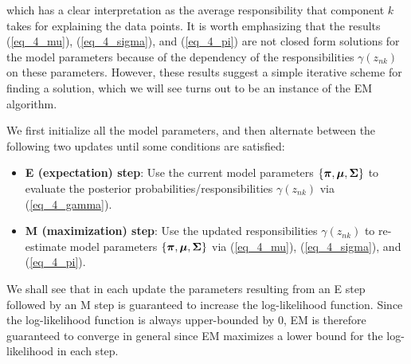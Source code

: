 \documentclass[../book-template.tex]{subfiles}
\begin{document}
which has a clear interpretation as the average responsibility that component $k$ takes for explaining the data points. It is worth emphasizing that the results (\ref{eq_4_mu}), (\ref{eq_4_sigma}), and (\ref{eq_4_pi}) are not closed form solutions for the model parameters because of the dependency of the responsibilities $\gamma(z_{nk})$ on these parameters. However, these results suggest a simple iterative scheme for finding a solution, which we will see turns out to be an instance of the EM algorithm. 
\par We first initialize all the model parameters, and then alternate between the following two updates until some conditions are satisfied:
\begin{itemize}
	\item  \textbf{E (expectation) step}: Use the current model parameters $\{\bm{\pi}, \bm{\mu}, {\bf \Sigma}\}$ to evaluate the posterior probabilities/responsibilities $\gamma(z_{nk})$ via (\ref{eq_4_gamma}).
	\item  \textbf{M (maximization) step}: Use the updated responsibilities $\gamma(z_{nk})$ to re-estimate model parameters $\{\bm{\pi}, \bm{\mu}, {\bf \Sigma}\}$ via (\ref{eq_4_mu}), (\ref{eq_4_sigma}), and (\ref{eq_4_pi}).
\end{itemize}
We shall see that in each update the parameters resulting from an E step followed by an M step is guaranteed to increase the log-likelihood function. Since the log-likelihood function is always upper-bounded by 0, EM is therefore guaranteed to converge in general since EM maximizes a lower bound for the log-likelihood in each step.
\end{document}
